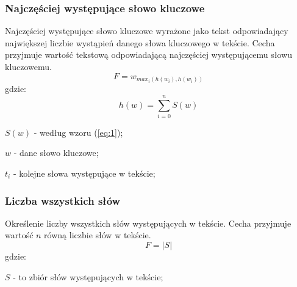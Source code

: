 \documentclass{classrep}
\begin{document}
\subsubsection{Najczęściej występujące słowo kluczowe}
Najczęściej występujące słowo kluczowe wyrażone jako tekst odpowiadający największej liczbie wystąpień danego
słowa kluczowego w tekście. Cecha przyjmuje wartość tekstową odpowiadającą najczęściej występującemu słowu kluczowemu.
\begin{equation}
    F= w_{max_{i}(h(w_{i}), h(w_{i}))}
\end{equation}
gdzie:
\begin{equation}
    h(w)=\sum_{i=0}^{n} S(w)
\end{equation}
\begin{description}
    \item $S(w)$ - według wzoru (\ref{eq:1});
    \item $w$ - dane słowo kluczowe;
    \item $t_{i}$ - kolejne słowa występujące w tekście;
\end{description}

\subsubsection{Liczba wszystkich słów}
Określenie liczby wszystkich słów występujących w tekście. 
Cecha przyjmuje wartość $n$ równą liczbie słów w tekście.
\begin{equation}
    F=|S|
\end{equation}
gdzie:\\
\begin{description}
    \item $S$ - to zbiór słów występujących w tekście;
\end{description}

%
\end{document}
